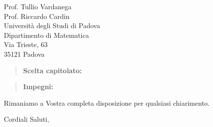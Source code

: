 \documentclass{articoletteracdp}
\begin{document}
\begin{letter}{
			Prof. Tullio Vardanega \\
			Prof. Riccardo Cardin \\
			Università degli Studi di Padova \\
			Dipartimento di Matematica \\
			Via Trieste, 63 \\
			35121 Padova
		}
\begin{quotation}
			\newpage

			\textbf{Scelta capitolato:}
			
		\end{quotation}

		\begin{quotation}
			\textbf{Impegni:}
			
		\end{quotation}

		\vspace{0.5cm}
		Rimaniamo a Vostra completa disposizione per qualsiasi chiarimento.

		\vspace{0.5cm}
		\closing{ Cordiali Saluti,}

	\end{letter}
\end{document}
